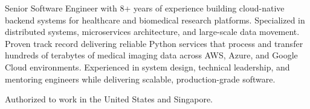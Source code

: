 

\begin{cvparagraph}

Senior Software Engineer with 8+ years of experience building cloud-native backend systems for
healthcare and biomedical research platforms. Specialized in distributed systems, microservices
architecture, and large-scale data movement. Proven track record delivering reliable Python services
that process and transfer hundreds of terabytes of medical imaging data across AWS, Azure, and
Google Cloud environments. Experienced in system design, technical leadership, and mentoring
engineers while delivering scalable, production-grade software.

Authorized to work in the United States and Singapore.
\end{cvparagraph}
